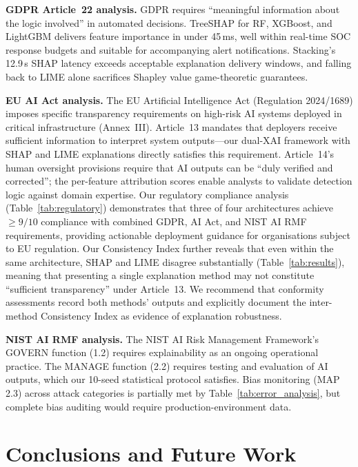 \documentclass[conference]{IEEEtran}
\begin{document}
\textbf{GDPR Article~22 analysis.} GDPR requires ``meaningful information about the logic involved'' in automated decisions. TreeSHAP for RF, XGBoost, and LightGBM delivers feature importance in under 45\,ms, well within real-time SOC response budgets and suitable for accompanying alert notifications. Stacking's 12.9\,s SHAP latency exceeds acceptable explanation delivery windows, and falling back to LIME alone sacrifices Shapley value game-theoretic guarantees.

\textbf{EU AI Act analysis.} The EU Artificial Intelligence Act (Regulation 2024/1689) imposes specific transparency requirements on high-risk AI systems deployed in critical infrastructure (Annex~III). Article~13 mandates that deployers receive sufficient information to interpret system outputs---our dual-XAI framework with SHAP and LIME explanations directly satisfies this requirement. Article~14's human oversight provisions require that AI outputs can be ``duly verified and corrected''; the per-feature attribution scores enable analysts to validate detection logic against domain expertise. Our regulatory compliance analysis (Table~\ref{tab:regulatory}) demonstrates that three of four architectures achieve $\geq 9/10$ compliance with combined GDPR, AI Act, and NIST AI RMF requirements, providing actionable deployment guidance for organisations subject to EU regulation. Our Consistency Index further reveals that even within the same architecture, SHAP and LIME disagree substantially (Table~\ref{tab:results}), meaning that presenting a single explanation method may not constitute ``sufficient transparency'' under Article~13. We recommend that conformity assessments record both methods' outputs and explicitly document the inter-method Consistency Index as evidence of explanation robustness.

\textbf{NIST AI RMF analysis.} The NIST AI Risk Management Framework's GOVERN function (1.2) requires explainability as an ongoing operational practice. The MANAGE function (2.2) requires testing and evaluation of AI outputs, which our 10-seed statistical protocol satisfies. Bias monitoring (MAP 2.3) across attack categories is partially met by Table~\ref{tab:error_analysis}, but complete bias auditing would require production-environment data.

\section{Conclusions and Future Work}
\end{document}
